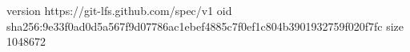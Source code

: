 version https://git-lfs.github.com/spec/v1
oid sha256:9e33f0ad0d5a567f9d07786ac1ebef4885c7f0ef1c804b3901932759f020f7fc
size 1048672
